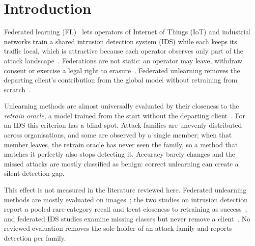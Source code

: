 \documentclass[pdflatex,sn-mathphys-num,iicol]{sn-jnl}
\begin{document}
\maketitle

\section{Introduction}\label{sec:intro}

Federated learning (FL)~\cite{mcmahan2017} lets operators of Internet of Things (IoT) and industrial networks train a shared intrusion detection system (IDS) while each keeps its traffic local, which is attractive because each operator observes only part of the attack landscape~\cite{bilal2026,peng2025fdids,chunduru2025}. Federations are not static: an operator may leave, withdraw consent or exercise a legal right to erasure~\cite{gdpr2016}. Federated unlearning removes the departing client's contribution from the global model without retraining from scratch~\cite{cao2015,bourtoule2021,liu2021federaser,halimi2022,wu2022distill}.

Unlearning methods are almost universally evaluated by their closeness to the \emph{retrain oracle}, a model trained from the start without the departing client~\cite{liu2021federaser,halimi2022,liu2025starfish,yang2026arfu}. For an IDS this criterion has a blind spot. Attack families are unevenly distributed across organisations, and some are observed by a single member; when that member leaves, the retrain oracle has never seen the family, so a method that matches it perfectly also stops detecting it. Accuracy barely changes and the missed attacks are mostly classified as benign: correct unlearning can create a silent detection gap.

This effect is not measured in the literature reviewed here. Federated unlearning methods are mostly evaluated on images~\cite{kwon2026,patra2026,wang2025fedbt,liu2025starfish,zhang2025cgkd}; the two studies on intrusion detection report a pooled rare-category recall and treat closeness to retraining as success~\cite{yang2026arfu,wang2026fuids}; and federated IDS studies examine missing classes but never remove a client~\cite{bilal2026,chunduru2025,peng2025fdids}. No reviewed evaluation removes the sole holder of an attack family and reports detection per family.
\end{document}
